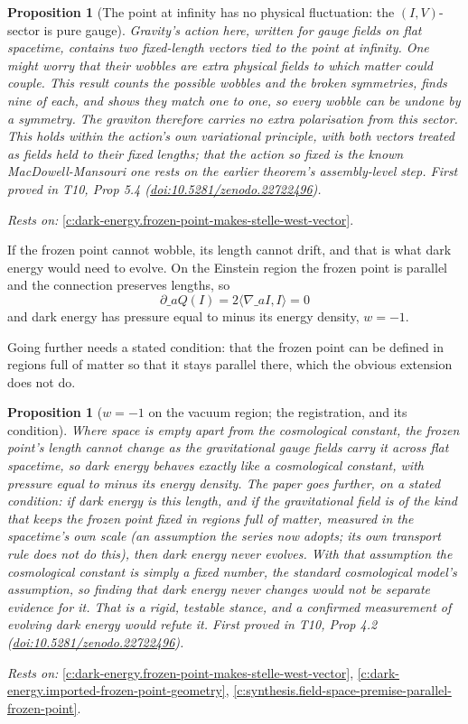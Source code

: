 \documentclass[11pt]{article}
\newtheorem{proposition}[theorem]{Proposition}
\theoremstyle{definition}
\theoremstyle{plain}
\providecommand{\ip}{}\renewcommand{\ip}[2]{\langle #1, #2\rangle}
\begin{document}
\begin{proposition}[The point at infinity has no physical fluctuation: the $(I,V)$-sector is pure gauge]\label{c:dark-energy.point-infinity-has-no-physical-fluctuation}
Gravity's action here, written for gauge fields on flat spacetime, contains two fixed-length vectors tied to the point at infinity. One might worry that their wobbles are extra physical fields to which matter could couple. This result counts the possible wobbles and the broken symmetries, finds nine of each, and shows they match one to one, so every wobble can be undone by a symmetry. The graviton therefore carries no extra polarisation from this sector. This holds within the action's own variational principle, with both vectors treated as fields held to their fixed lengths; that the action so fixed is the known MacDowell-Mansouri one rests on the earlier theorem's assembly-level step.
\emph{First proved in} T10, Prop 5.4 (\href{https://doi.org/10.5281/zenodo.22722496}{doi:10.5281/zenodo.22722496}).
\end{proposition}
\noindent\emph{Rests on:} \ref{c:dark-energy.frozen-point-makes-stelle-west-vector}.

If the frozen point cannot wobble, its length cannot drift, and that is what dark energy would need to evolve. On the Einstein region the frozen point is parallel and the connection preserves lengths, so \[ \partial\_a Q(I) = 2\ip{\nabla\_a I}{I} = 0 \] and dark energy has pressure equal to minus its energy density, $w = -1$.

Going further needs a stated condition: that the frozen point can be defined in regions full of matter so that it stays parallel there, which the obvious extension does not do.

\begin{proposition}[$w = -1$ on the vacuum region; the registration, and its condition]\label{c:dark-energy.vacuum-region-registration-condition}
Where space is empty apart from the cosmological constant, the frozen point's length cannot change as the gravitational gauge fields carry it across flat spacetime, so dark energy behaves exactly like a cosmological constant, with pressure equal to minus its energy density. The paper goes further, on a stated condition: if dark energy is this length, and if the gravitational field is of the kind that keeps the frozen point fixed in regions full of matter, measured in the spacetime's own scale (an assumption the series now adopts; its own transport rule does not do this), then dark energy never evolves. With that assumption the cosmological constant is simply a fixed number, the standard cosmological model's assumption, so finding that dark energy never changes would not be separate evidence for it. That is a rigid, testable stance, and a confirmed measurement of evolving dark energy would refute it.
\emph{First proved in} T10, Prop 4.2 (\href{https://doi.org/10.5281/zenodo.22722496}{doi:10.5281/zenodo.22722496}).
\end{proposition}
\noindent\emph{Rests on:} \ref{c:dark-energy.frozen-point-makes-stelle-west-vector}, \ref{c:dark-energy.imported-frozen-point-geometry}, \ref{c:synthesis.field-space-premise-parallel-frozen-point}.
\end{document}
